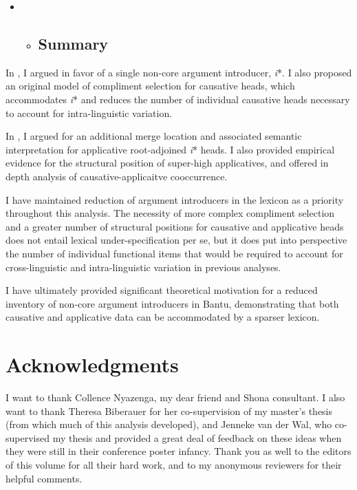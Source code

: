 \documentclass[output=paper,modfonts,nonflat]{langsci/langscibook}
\begin{document}
\begin{itemize}
\item \begin{itemize}
\item \subsection{Summary}
\end{itemize}
\end{itemize}

In , I argued in favor of a single non-core argument introducer, \textit{i}*. I also proposed an original model of compliment selection for causative heads, which accommodates \textit{i}* and reduces the number of individual causative heads necessary to account for intra-linguistic variation. 

In , I argued for an additional merge location and associated semantic interpretation for applicative root-adjoined \textit{i}* heads. I also provided empirical evidence for the structural position of super-high applicatives, and offered in depth analysis of causative-applicaitve cooccurrence. 

I have maintained reduction of argument introducers in the lexicon as a priority throughout this analysis. The necessity of more complex compliment selection and a greater number of structural positions for causative and applicative heads does not entail lexical under-specification per se, but it does put into perspective the number of individual functional items that would be required to account for cross-linguistic and intra-linguistic variation in previous analyses. 

\begin{styleDefault}
I have ultimately provided significant theoretical motivation for a reduced inventory of non-core argument introducers in Bantu, demonstrating that both causative and applicative data can be accommodated by a sparser lexicon. 
\end{styleDefault}

\section{Acknowledgments}

I want to thank Collence Nyazenga, my dear friend and Shona consultant. I also want to thank Theresa Biberauer for her co-supervision of my master’s thesis (from which much of this analysis developed), and Jenneke van der Wal, who co-supervised my thesis and provided a great deal of feedback on these ideas when they were still in their conference poster infancy. Thank you as well to the editors of this volume for all their hard work, and to my anonymous reviewers for their helpful comments.  
\end{document}
